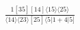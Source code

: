 \documentclass[varwidth, border=5pt]{standalone}
\begin{document}
\begin{my}
$\begin{gathered}
\scriptscriptstyle\frac{1[35][14]⟨15⟩⟨25⟩}{⟨14⟩⟨23⟩[25]⟨5|1+4|5]}
\end{gathered}$
\end{my}
\end{document}
